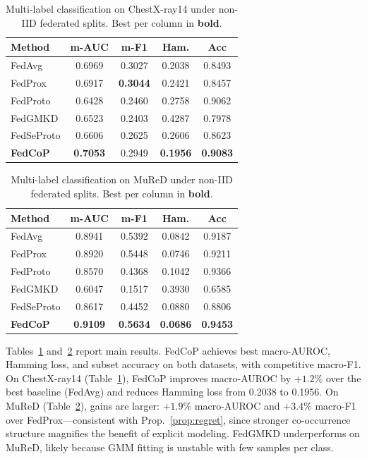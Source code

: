 \documentclass[10pt,twocolumn,letterpaper]{article}
\theoremstyle{definition}
\begin{document}
\begin{table}[t]
\centering
\caption{Multi-label classification on ChestX-ray14 under non-IID federated splits. Best per column in \textbf{bold}.}
\label{tab:main_chest}
\footnotesize
\setlength{\tabcolsep}{5pt}
\begin{tabular}{lcccc}
\toprule
Method & m-AUC & m-F1 & Ham. & Acc \\
\midrule
FedAvg    & 0.6969 & 0.3027 & 0.2038 & 0.8493 \\
FedProx   & 0.6917 & \textbf{0.3044} & 0.2421 & 0.8457 \\
FedProto  & 0.6428 & 0.2460 & 0.2758 & 0.9062 \\
FedGMKD   & 0.6523 & 0.2403 & 0.4287 & 0.7978 \\
FedSeProto& 0.6606 & 0.2625 & 0.2606 & 0.8623 \\
\midrule
\textbf{FedCoP} & \textbf{0.7053} & 0.2949 & \textbf{0.1956} & \textbf{0.9083} \\
\bottomrule
\end{tabular}
\end{table}

\begin{table}[t]
\centering
\caption{Multi-label classification on MuReD under non-IID federated splits. Best per column in \textbf{bold}.}
\label{tab:main_mured}
\footnotesize
\setlength{\tabcolsep}{5pt}
\begin{tabular}{lcccc}
\toprule
Method & m-AUC & m-F1 & Ham. & Acc \\
\midrule
FedAvg    & 0.8941 & 0.5392 & 0.0842 & 0.9187 \\
FedProx   & 0.8920 & 0.5448 & 0.0746 & 0.9211 \\
FedProto  & 0.8570 & 0.4368 & 0.1042 & 0.9366 \\
FedGMKD   & 0.6047 & 0.1517 & 0.3930 & 0.6585 \\
FedSeProto& 0.8617 & 0.4452 & 0.0880 & 0.8806 \\
\midrule
\textbf{FedCoP} & \textbf{0.9109} & \textbf{0.5634} & \textbf{0.0686} & \textbf{0.9453} \\
\bottomrule
\end{tabular}
\end{table}

Tables~\ref{tab:main_chest} and~\ref{tab:main_mured} report main results. FedCoP achieves best macro-AUROC, Hamming loss, and subset accuracy on both datasets, with competitive macro-F1. On ChestX-ray14 (Table~\ref{tab:main_chest}), FedCoP improves macro-AUROC by $+1.2\%$ over the best baseline (FedAvg) and reduces Hamming loss from 0.2038 to 0.1956. On MuReD (Table~\ref{tab:main_mured}), gains are larger: $+1.9\%$ macro-AUROC and $+3.4\%$ macro-F1 over FedProx---consistent with Prop.~\ref{prop:regret}, since stronger co-occurrence structure magnifies the benefit of explicit modeling. FedGMKD underperforms on MuReD, likely because GMM fitting is unstable with few samples per class.
\end{document}

